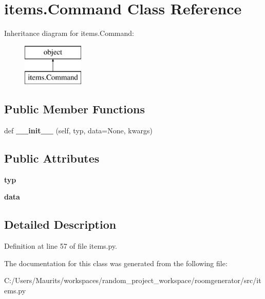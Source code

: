 \hypertarget{classitems_1_1_command}{}\section{items.\+Command Class Reference}
\label{classitems_1_1_command}
Inheritance diagram for items.\+Command\+:\begin{figure}[H]
\begin{center}
\leavevmode
\includegraphics[height=2.000000cm]{classitems_1_1_command}
\end{center}
\end{figure}
\subsection*{Public Member Functions}
\begin{DoxyCompactItemize}
\item 
\hypertarget{classitems_1_1_command_a6eeb22e8d48035c196d41bca7dcc9e26}{}def {\bfseries \+\_\+\+\_\+init\+\_\+\+\_\+} (self, typ, data=None, kwargs)\label{classitems_1_1_command_a6eeb22e8d48035c196d41bca7dcc9e26}

\end{DoxyCompactItemize}
\subsection*{Public Attributes}
\begin{DoxyCompactItemize}
\item 
\hypertarget{classitems_1_1_command_a653987d5c7486f9717c367f9ea32a531}{}{\bfseries typ}\label{classitems_1_1_command_a653987d5c7486f9717c367f9ea32a531}

\item 
\hypertarget{classitems_1_1_command_ae32c004e02e093045ba9efd912a461fa}{}{\bfseries data}\label{classitems_1_1_command_ae32c004e02e093045ba9efd912a461fa}

\end{DoxyCompactItemize}


\subsection{Detailed Description}


Definition at line 57 of file items.\+py.



The documentation for this class was generated from the following file\+:\begin{DoxyCompactItemize}
\item 
C\+:/\+Users/\+Maurits/workspaces/random\+\_\+project\+\_\+workspace/roomgenerator/src/items.\+py\end{DoxyCompactItemize}
